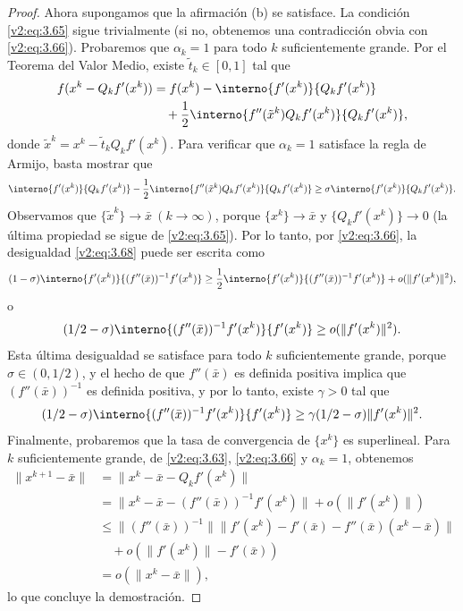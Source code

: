 \begin{proof}
    Ahora supongamos que la afirmación (b) se satisface. La condición \eqref{v2:eq:3.65} sigue trivialmente (si no, obtenemos una contradicción obvia con \eqref{v2:eq:3.66}).
    Probaremos que $\alpha_k = 1$ para todo $k$ suficientemente grande. Por el Teorema del Valor Medio, existe $\tilde{t}_k \in [0, 1]$ tal que
    \begin{align*}
        f(x^k - Q_k f'(x^k)) &= f(x^k) - \interno{f'(x^k)}{Q_k f'(x^k)} \\
        &\quad + \frac{1}{2}\interno{f''(\tilde{x}^k) Q_k f'(x^k)}{Q_k f'(x^k)},
    \end{align*}
    donde $\tilde{x}^k = x^k - \tilde{t}_k Q_k f'(x^k)$. Para verificar que $\alpha_k = 1$ satisface la regla de Armijo, basta mostrar que
    \begin{equation}
        \interno{f'(x^k)}{Q_k f'(x^k)} - \frac{1}{2}\interno{f''(\tilde{x}^k) Q_k f'(x^k)}{Q_k f'(x^k)} \ge \sigma \interno{f'(x^k)}{Q_k f'(x^k)}. \label{v2:eq:3.68}
    \end{equation}
    Observamos que $\{\tilde{x}^k\} \to \bar{x} \ (k \to \infty)$, porque $\{x^k\} \to \bar{x}$ y $\{Q_k f'(x^k)\} \to 0$ (la última propiedad se sigue de \eqref{v2:eq:3.65}). Por lo tanto, por \eqref{v2:eq:3.66}, la desigualdad \eqref{v2:eq:3.68} puede ser escrita como
    \[
        (1 - \sigma)\interno{f'(x^k)}{(f''(\bar{x}))^{-1} f'(x^k)} \ge \frac{1}{2}\interno{f'(x^k)}{(f''(\bar{x}))^{-1} f'(x^k)} + o(\|f'(x^k)\|^2),
    \]
    o
    \[
        (1/2 - \sigma)\interno{(f''(\bar{x}))^{-1} f'(x^k)}{f'(x^k)} \ge o(\|f'(x^k)\|^2).
    \]
    Esta última desigualdad se satisface para todo $k$ suficientemente grande, porque $\sigma \in (0, 1/2)$, y el hecho de que $f''(\bar{x})$ es definida positiva implica que $(f''(\bar{x}))^{-1}$ es definida positiva, y por lo tanto, existe $\gamma > 0$ tal que
    \[
        (1/2 - \sigma)\interno{(f''(\bar{x}))^{-1} f'(x^k)}{f'(x^k)} \ge \gamma (1/2 - \sigma) \|f'(x^k)\|^2.
    \]
    Finalmente, probaremos que la tasa de convergencia de $\{x^k\}$ es superlineal. Para $k$ suficientemente grande, de \eqref{v2:eq:3.63}, \eqref{v2:eq:3.66} y $\alpha_k = 1$, obtenemos
    \begin{align*}
        \|x^{k+1} - \bar{x}\| &= \|x^k - \bar{x} - Q_k f'(x^k)\| \\
        &= \|x^k - \bar{x} - (f''(\bar{x}))^{-1} f'(x^k)\| + o(\|f'(x^k)\|) \\
        &\le \|(f''(\bar{x}))^{-1}\| \|f'(x^k) - f'(\bar{x}) - f''(\bar{x})(x^k - \bar{x})\| \\
        &\quad + o(\|f'(x^k)\| - f'(\bar{x})) \\
        &= o(\|x^k - \bar{x}\|),
    \end{align*}
    lo que concluye la demostración.
\end{proof}

